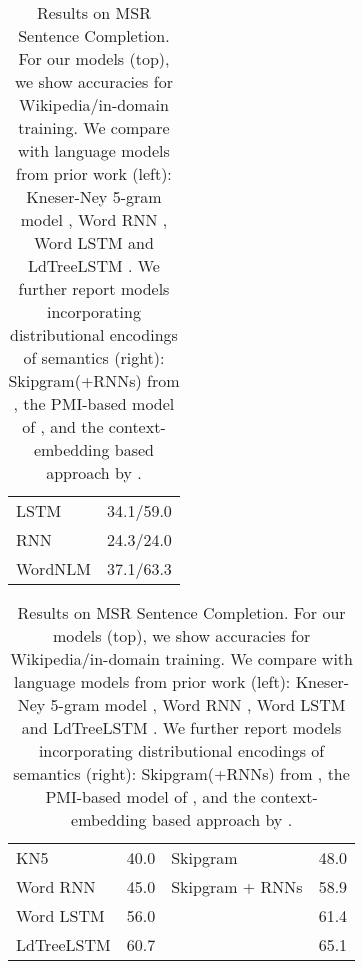 \begin{table}[t]
  \footnotesize{
    \begin{center}
      \begin{tabular}{l|l}
\hline
        LSTM 	    &      34.1/59.0 \\ %
        RNN  &     24.3/24.0 \\ %
        WordNLM & 37.1/63.3 \\ %
\end{tabular}

\begin{tabular}{l|l||l|l}
\hline
        KN5   & 40.0            & Skipgram         & 48.0    \\                                
        Word RNN & 45.0         & Skipgram + RNNs  & 58.9 \\                                  
        Word LSTM & 56.0        & \citet{woods2016exploiting} &  61.4 \\                      
        LdTreeLSTM  & 60.7     &  \citet{melamud2016context2vec} & 65.1 \\       \hline
             \end{tabular}
    \end{center}
  }
  \caption{\label{tab:msr-completion-results} Results on MSR Sentence Completion. For our models (top), we show accuracies for  Wikipedia/in-domain training. We compare with language models from prior work (left): Kneser-Ney 5-gram model \cite{Mikolov:2012}, Word RNN \cite{zweig2012computational}, Word LSTM and LdTreeLSTM \cite{zhang2016top}. We further report models incorporating distributional encodings of semantics (right): Skipgram(+RNNs) from , the PMI-based model of \citet{woods2016exploiting}, and the context-embedding based approach by \citet{melamud2016context2vec}.}
\end{table}


